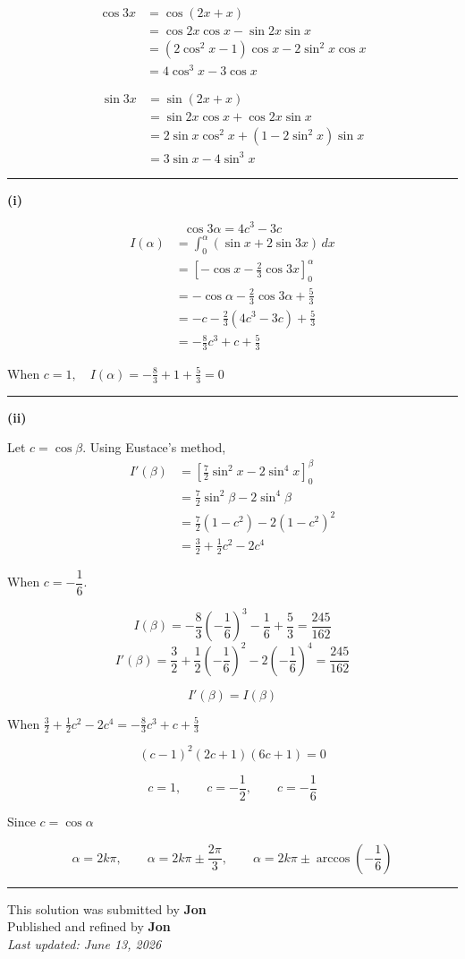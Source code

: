 \documentclass[12pt]{article}
\begin{document}
\newcommand{\ds}{\displaystyle}


\[
\begin{aligned}
\cos3x&=\cos(2x+x)\\
&=\cos2x\cos x-\sin2x\sin x\\
&=(2\cos^2x-1)\cos x-2\sin^2x\cos x\\
&=\boxed{4\cos^3x-3\cos x}
\end{aligned}
\]

\[
\begin{aligned}
\sin3x&=\sin(2x+x)\\
&=\sin2x\cos x+\cos2x\sin x\\
&=2\sin x\cos^2x+(1-2\sin^2x)\sin x\\
&=\boxed{3\sin x-4\sin^3x}
\end{aligned}
\]

\bigskip\hrule\bigskip

\textbf{(i)}

$$\cos3\alpha=4c^3-3c$$
\begin{align*}
I(\alpha)
&=\int_0^\alpha(\sin x+2\sin3x)\,dx\\
&=\left[-\cos x-\frac23\cos3x\right]_0^\alpha\\
&=-\cos\alpha-\frac23\cos3\alpha+\frac53\\
&=-c-\frac23(4c^3-3c)+\frac53\\
&=\boxed{-\frac83c^3+c+\frac53}
\end{align*}

When $\displaystyle c=1, \quad
\displaystyle I(\alpha)=-\frac83+1+\frac53=0$

\bigskip\hrule\bigskip

\textbf{(ii)}

Let $c=\cos\beta$. Using Eustace's method,
\begin{align*}
I'(\beta)
&=\left[\frac72\sin^2x-2\sin^4x\right]_0^\beta\\
&=\frac72\sin^2\beta-2\sin^4\beta\\
&=\frac72(1-c^2)-2(1-c^2)^2\\
&=\frac32+\frac12c^2-2c^4
\end{align*}

When $c=-\dfrac16$.

$$I(\beta)=-\frac83\left(-\frac16\right)^3-\frac16+\frac53=\frac{245}{162}$$
$$I'(\beta)=\frac32+\frac12\left(-\frac16\right)^2-2\left(-\frac16\right)^4=\frac{245}{162}$$

\[
\boxed{I'(\beta)=I(\beta)}
\]

When
$\displaystyle \frac32+\frac12c^2-2c^4=-\frac83c^3+c+\frac53$

$$(c-1)^2(2c+1)(6c+1)=0$$

$$c=1,\qquad c=-\frac12,\qquad c=-\frac16$$

Since $c=\cos\alpha$

$$
\boxed{
\alpha=2k\pi,\qquad
\alpha=2k\pi\pm\frac{2\pi}{3},\qquad
\alpha=2k\pi\pm\arccos\left(-\frac16\right)
}
$$
\bigskip
\hrule
\begin{center}
    This solution was submitted by \textbf{Jon}\\[4pt]
    Published and refined by \textbf{Jon}\\[8pt]
    \textit{Last updated: June 13, 2026}
\end{center}
\end{document}
